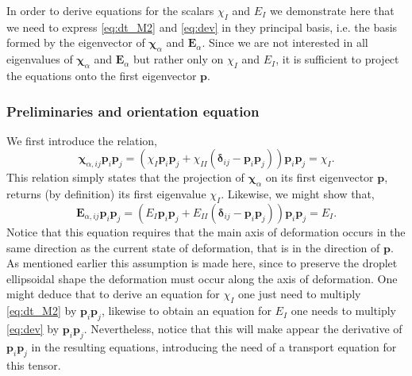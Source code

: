 In order to derive equations for the scalars $\chi_I$ and $E_I$ we demonstrate here that we need to express \ref{eq:dt_M2} and \ref{eq:dev} in they principal basis, i.e. the basis formed by the eigenvector of $\bm\chi_\alpha$ and $\textbf{E}_\alpha$. 
Since we are not interested in all eigenvalues of $\bm\chi_\alpha$ and $\textbf{E}_\alpha$ but rather only on $\chi_I$ and $E_I$, it is sufficient to project the equations onto the first eigenvector $\textbf{p}$. 

\subsubsection{Preliminaries and orientation equation}
We first introduce the relation,
\begin{equation}
    \bm\chi_{\alpha,ij} \textbf{p}_i\textbf{p}_j
    = 
    (
        \chi_I \textbf{p}_i\textbf{p}_j
        + \chi_{II} (\bm\delta_{ij} - \textbf{p}_i\textbf{p}_j)
    ) \textbf{p}_i\textbf{p}_j
    = \chi_I.
    \label{eq:chi_I_def}
\end{equation} 
This relation simply states that the projection of $\bm\chi_\alpha$ on its first eigenvector $\textbf{p}$, returns (by definition) its first eigenvalue $\chi_I$. 
Likewise, we might show that, 
\begin{equation}
    \textbf{E}_{\alpha,ij} \textbf{p}_i\textbf{p}_j
    = 
    (
        E_I \textbf{p}_i\textbf{p}_j
        + E_{II} (\bm\delta_{ij} - \textbf{p}_i\textbf{p}_j)
    ) \textbf{p}_i\textbf{p}_j
    = E_I.
    \label{eq:E_I_def}
\end{equation} 
Notice that this equation requires that the main axis of deformation occurs in the same direction as the current state of deformation, that is in the direction of $\textbf{p}$. 
As mentioned earlier this assumption is made here, since to preserve the droplet ellipsoidal shape the deformation must occur along the axis of deformation. 
One might deduce that to derive an equation for $\chi_I$ one just need to multiply \ref{eq:dt_M2} by $\textbf{p}_i \textbf{p}_j$, likewise to obtain an equation for $E_I$ one needs to multiply \ref{eq:dev} by $\textbf{p}_i \textbf{p}_j$. 
Nevertheless, notice that this will make appear the derivative of $\textbf{p}_i \textbf{p}_j$ in the resulting equations, introducing the need of a transport equation for this tensor. 

